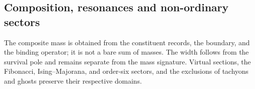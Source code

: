 \let\subsubsection\paragraph
\let\clearpage\relax

\endgroup
\begingroup
\let\chapter\section
\let\section\subsection
\let\subsection\subsubsection
\let\subsubsection\paragraph
\let\clearpage\relax

\endgroup

\section{Composition, resonances and non-ordinary sectors}
The composite mass is obtained from the constituent records, the boundary, and the
binding operator; it is not a bare sum of masses. The width follows from the
survival pole and remains separate from the mass signature. Virtual
sections, the Fibonacci, Ising--Majorana, and order-six sectors, and the
exclusions of tachyons and ghosts preserve their respective domains.

